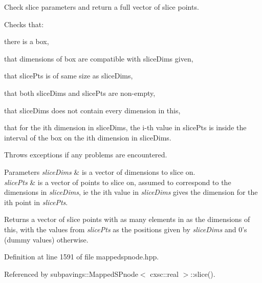 \-Check slice parameters and return a full vector of slice points. 

\-Checks that\-: 
\begin{DoxyItemize}
\item there is a box, 
\item that dimensions of box are compatible with slice\-Dims given, 
\item that slice\-Pts is of same size as slice\-Dims, 
\item that both slice\-Dims and slice\-Pts are non-\/empty, 
\item that slice\-Dims does not contain every dimension in this, 
\item that for the ith dimension in slice\-Dims, the i-\/th value in slice\-Pts is inside the interval of the box on the ith dimension in slice\-Dims. 
\end{DoxyItemize}

\-Throws exceptions if any problems are encountered.


\begin{DoxyParams}{\-Parameters}
{\em slice\-Dims} & is a vector of dimensions to slice on. \\
\hline
{\em slice\-Pts} & is a vector of points to slice on, assumed to correspond to the dimensions in {\itshape slice\-Dims\/}, ie the ith value in {\itshape slice\-Dims\/} gives the dimension for the ith point in {\itshape slice\-Pts\/}. \\
\hline
\end{DoxyParams}
\begin{DoxyReturn}{\-Returns}
a vector of slice points with as many elements in as the dimensions of this, with the values from {\itshape slice\-Pts\/} as the positions given by {\itshape slice\-Dims\/} and 0's (dummy values) otherwise. 
\end{DoxyReturn}


\-Definition at line 1591 of file mappedspnode.\-hpp.



\-Referenced by subpavings\-::\-Mapped\-S\-Pnode$<$ cxsc\-::real $>$\-::slice().


